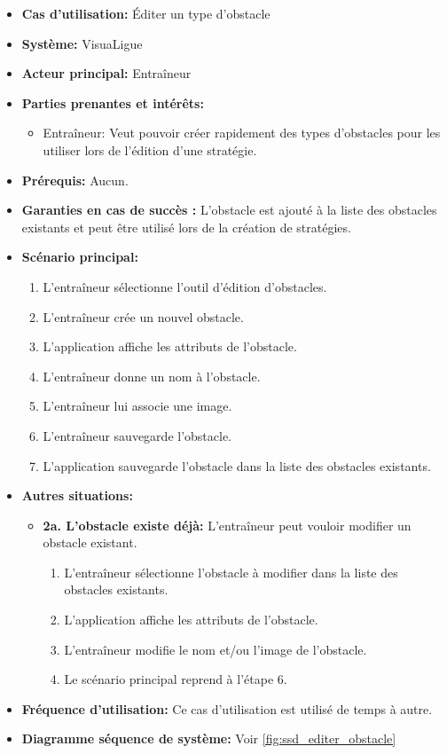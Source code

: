 \begin{itemize}
    \item \textbf{Cas d'utilisation:} \'Editer un type d'obstacle
    \item \textbf{Syst\`eme:} VisuaLigue
    \item \textbf{Acteur principal:} Entra\^ineur
    \item \textbf{Parties prenantes et int\'er\^ets:}
        \begin{itemize}
            \item Entra\^ineur: Veut pouvoir cr\'eer rapidement des types d'obstacles pour les utiliser lors de l'\'edition d'une strat\'egie.
        \end{itemize}
    \item \textbf{Pr\'erequis:} Aucun.
    \item \textbf{Garanties en cas de succ\`es :} L'obstacle est ajout\'e \`a la liste des obstacles existants et peut \^etre utilis\'e lors de la cr\'eation de strat\'egies.
    \item \textbf{Sc\'enario principal:}
        \begin{enumerate}
        	\item L'entraîneur sélectionne l'outil d'édition d'obstacles.
        	\item L'entraîneur crée un nouvel obstacle.
        	\item L'application affiche les attributs de l'obstacle.
            \item L'entra\^ineur donne un nom \`a l'obstacle.
            \item L'entra\^ineur lui associe une image.
            \item L'entra\^ineur sauvegarde l'obstacle.
            \item L'application sauvegarde l'obstacle dans la liste des obstacles existants.
        \end{enumerate}
    \item \textbf{Autres situations:} 
    	\begin{itemize}
    		\item \textbf{2a. L'obstacle existe déjà: } L'entraîneur peut vouloir modifier un obstacle existant.
    		\begin{enumerate}
    			\item L'entraîneur sélectionne l'obstacle à modifier dans la liste des obstacles existants.
    			\item L'application affiche les attributs de l'obstacle.
    			\item L'entraîneur modifie le nom et/ou l'image de l'obstacle.
    			\item Le scénario principal reprend à l'étape 6.
    		\end{enumerate}
    	\end{itemize}
    \item \textbf{Fréquence d'utilisation:} Ce cas d'utilisation est utilis\'e de temps \`a autre.
    \item \textbf{Diagramme s\'equence de syst\`eme:} Voir \ref{fig:ssd_editer_obstacle}
\end{itemize}
